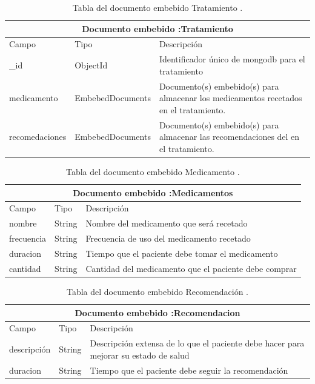 \begin{table}[htb]
	\centering
	\begin{tabular}{| p{3.5cm}| p{3.0cm} | p{9.8cm} |}
	\hline
	\multicolumn{3}{|c|}{Documento embebido :Tratamiento} \\
	\hline
	Campo & Tipo &  Descripción\\ \hline
	
	\_id & ObjectId & Identificador único de mongodb para el tratamiento \\ \hline
	medicamento & EmbebedDocuments & Documento(s) embebido(s) para almacenar los medicamentos recetados en el tratamiento. \\ \hline
	
	recomedaciones & EmbebedDocuments & Documento(s) embebido(s) para almacenar las recomendaciones del  en el tratamiento. \\ \hline
	
	\end{tabular}
	\caption{Tabla del documento embebido Tratamiento .}
	\label{tabla:diccionarioDatos}
	\end{table}


\begin{table}[htb]
	\centering
	\begin{tabular}{| p{3.5cm}| p{3.0cm} | p{9.8cm} |}
	\hline
	\multicolumn{3}{|c|}{Documento embebido :Medicamentos} \\
	\hline
	Campo & Tipo &  Descripción\\ \hline
		
	nombre & String & Nombre del medicamento que será recetado \\ \hline
	frecuencia & String & Frecuencia de uso del medicamento recetado \\ \hline
	duracion & String & Tiempo que el paciente debe tomar el medicamento\\ \hline
	cantidad & String & Cantidad del medicamento que el paciente debe comprar	\\ \hline
	
	\end{tabular}
	\caption{Tabla del documento embebido Medicamento .}
	\label{tabla:diccionarioDatos}
	\end{table}


\begin{table}[htb]
	\centering
	\begin{tabular}{| p{3.5cm}| p{3.0cm} | p{9.8cm} |}
	\hline
	\multicolumn{3}{|c|}{Documento embebido :Recomendacion} \\
	\hline
	Campo & Tipo &  Descripción\\ \hline
	
	
	
	descripción & String & Descripción extensa de lo que el paciente debe hacer para mejorar su estado de salud \\ \hline
	duracion & String & Tiempo que el paciente debe seguir la recomendación \\ \hline
	
	
	\end{tabular}
	\caption{Tabla del documento embebido Recomendación .}
	\label{tabla:diccionarioDatos}
	\end{table}
	

